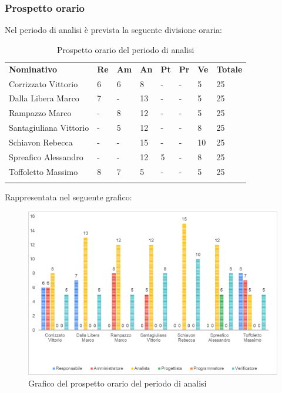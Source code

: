 		\subsubsection{Prospetto orario}
		Nel periodo di analisi è prevista la seguente divisione oraria:
		\begin{longtable} {				
				>{}p{40mm}  
				>{}p{8mm}
				>{}p{8mm}
				>{}p{8mm}
				>{}p{8mm}
				>{}p{8mm}
				>{}p{8mm}
				>{}p{12mm}				
			}			
			\rowcolor{gray!50}
			\textbf{Nominativo} & \textbf{Re} & \textbf{Am} & \textbf{An} & \textbf{Pt} & \textbf{Pr} & \textbf{Ve} & \textbf{Totale}	\TBstrut \\ [2mm]
			Corrizzato Vittorio & 6 & 6 & 8 & - & - & 5 & 25 \TBstrut \\ [2mm]
			Dalla Libera Marco & 7 & - & 13 & - & - & 5 & 25 \TBstrut \\ [2mm]
			Rampazzo Marco & - & 8 & 12 & - & - & 5 & 25 \TBstrut \\ [2mm]
			Santagiuliana Vittorio & - & 5 & 12 & - & - & 8 & 25 \TBstrut \\ [2mm]
			Schiavon Rebecca & - & - & 15 & - & - & 10 & 25 \TBstrut \\ [2mm]
			Spreafico Alessandro & - & - & 12 & 5 & - & 8 & 25 \TBstrut \\ [2mm]
			Toffoletto Massimo & 8 & 7 & 5 & - & - & 5 & 25 \TBstrut \\ [2mm]
			\rowcolor{white}
			\caption{Prospetto orario del periodo di analisi}
		\end{longtable}
		Rappresentata nel seguente grafico:
		\begin{figure} [H]
			\includegraphics[width=\linewidth]{./img/Grafici/1.png}
			\caption{Grafico del prospetto orario del periodo di analisi}
		\end{figure}
	
